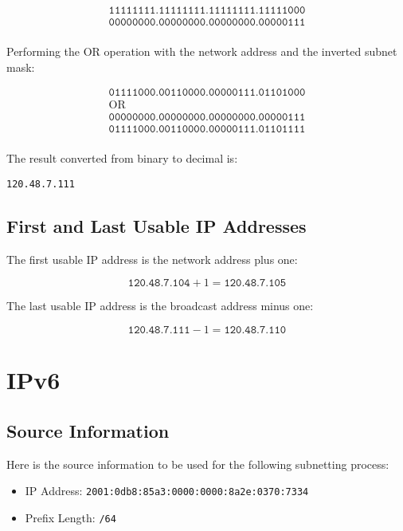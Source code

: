 \documentclass{article}
\begin{document}
\[
\begin{array}{c}
\texttt{11111111.11111111.11111111.11111000} \\
\hline
\texttt{00000000.00000000.00000000.00000111} \\
\end{array}
\]

Performing the OR operation with the network address and the inverted subnet mask:

\[
\begin{array}{c}
\texttt{01111000.00110000.00000111.01101000} \\
\text{OR} \\
\texttt{00000000.00000000.00000000.00000111} \\
\hline
\texttt{01111000.00110000.00000111.01101111} \\
\end{array}
\]

The result converted from binary to decimal is:

\texttt{120.48.7.111}

\subsection*{First and Last Usable IP Addresses}

The first usable IP address is the network address plus one:

\[
\texttt{120.48.7.104} + 1 = \texttt{120.48.7.105}
\]

The last usable IP address is the broadcast address minus one:

\[
\texttt{120.48.7.111} - 1 = \texttt{120.48.7.110}
\]

\newpage

\section*{IPv6}

\subsection*{Source Information}

Here is the source information to be used for the following subnetting process:

\begin{itemize}
    \item IP Address: \texttt{2001:0db8:85a3:0000:0000:8a2e:0370:7334}
    \item Prefix Length: \texttt{/64}
\end{itemize}
\end{document}
